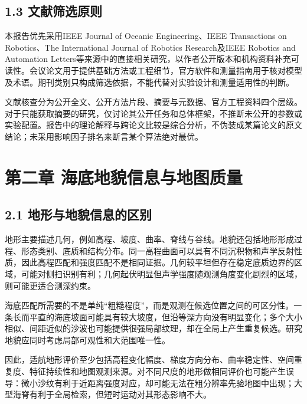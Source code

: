 \hypertarget{ux6587ux732eux7b5bux9009ux539fux5219}{%
\subsection{1.3 文献筛选原则}\label{ux6587ux732eux7b5bux9009ux539fux5219}}

本报告优先采用IEEE Journal of Oceanic Engineering、IEEE Transactions on Robotics、The International Journal of Robotics Research及IEEE Robotics and Automation Letters等来源中的直接相关研究，以作者公开版本和机构资料补充可读性。会议论文用于提供基础方法或工程细节，官方软件和测量指南用于核对模型及术语。期刊类别只构成筛选依据，不能代替对实验设计和测量适用性的判断。

文献核查分为公开全文、公开方法片段、摘要与元数据、官方工程资料四个层级。对于只能获取摘要的研究，仅讨论其公开任务和总体框架，不推断未公开的参数或实验配置。报告中的理论解释与跨论文比较是综合分析，不伪装成某篇论文的原文结论；未采用影响因子排名来断言某个算法绝对最优。

\hypertarget{ux7b2cux4e8cux7ae0-ux6d77ux5e95ux5730ux8c8cux4fe1ux606fux4e0eux5730ux56feux8d28ux91cf}{%
\section{第二章 海底地貌信息与地图质量}\label{ux7b2cux4e8cux7ae0-ux6d77ux5e95ux5730ux8c8cux4fe1ux606fux4e0eux5730ux56feux8d28ux91cf}}

\hypertarget{ux5730ux5f62ux4e0eux5730ux8c8cux4fe1ux606fux7684ux533aux522b}{%
\subsection{2.1 地形与地貌信息的区别}\label{ux5730ux5f62ux4e0eux5730ux8c8cux4fe1ux606fux7684ux533aux522b}}

地形主要描述几何，例如高程、坡度、曲率、脊线与谷线。地貌还包括地形形成过程、形态类别、底质和结构分布。同一高程曲面可以具有不同沉积物和声学反射性质，因此高程匹配和强度匹配不是相同证据。几何较平坦但存在稳定底质边界的区域，可能对侧扫识别有利；几何起伏明显但声学强度随观测角度变化剧烈的区域，则可能更适合测深约束。

海底匹配所需要的不是单纯``粗糙程度''，而是观测在候选位置之间的可区分性。一条长而平直的海底坡面可能具有较大坡度，但沿等深方向没有明显变化；多个大小相似、间距近似的沙波也可能提供很强局部纹理，却在全局上产生重复候选。研究地貌应同时考虑局部可观性和大范围唯一性。

因此，适航地形评价至少包括高程变化幅度、梯度方向分布、曲率稳定性、空间重复度、特征持续性和地图观测来源。对不同尺度的地形做相同评价也可能产生误导：微小沙纹有利于近距离强度对应，却可能无法在粗分辨率先验地图中出现；大型海脊有利于全局检索，但短时运动对其形态影响不大。

